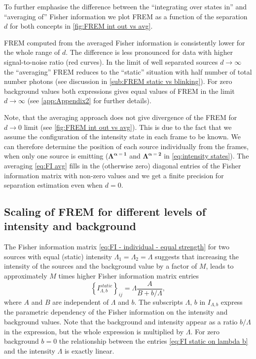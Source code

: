 To further emphasise the difference between the ``integrating over states in'' and ``averaging of'' Fisher information we plot FREM as a function of the separation $d$ for both concepts in \autoref{fig:FREM int out vs avg}.

FREM computed from the averaged Fisher information is consistently lower for the whole range of $d$. The difference is less pronounced for data with higher signal-to-noise ratio (red curves). In the limit of well separated sources $d\rightarrow\infty$ the ``averaging'' FREM reduces to the ``static'' situation with half number of total number photons (see discussion in \autoref{sub:FREM static vs blinking}). For zero background values both expressions gives equal values of FREM in the limit $d\rightarrow\infty$ (see \autoref{app:Appendix2} for further details).

Note, that the averaging approach does not give divergence of the FREM for $d\rightarrow 0$ limit (see \autoref{fig:FREM int out vs avg}\aaa). This is due to the fact that we assume the configuration of the intensity state in each frame to be known. We can therefore determine the position of each source individually from the frames, when only one source is emitting ($\bm{\Lambda^{\alpha=1}}$ and $\bm{\Lambda^{\alpha=2}}$ in \autoref{eq:intensity states}). The averaging \autoref{eq:FI avg} fills in the (otherwise zero) diagonal entries of the Fisher information matrix with non-zero values and we get a finite precision for separation estimation even when $d=0$.


\subsection{Scaling of FREM for different levels of intensity and background\label{sub:scaling}}

The Fisher information matrix \autoref{eq:FI - individual - equal strength} for two sources with equal (static) intensity $\Lambda_1=\Lambda_2=\Lambda$ suggests that increasing the intensity of the sources and the background value by a factor of $M$, leads to approximately $M$ times higher Fisher information matrix entries
%
\begin{equation}
	\left\{I_{\Lambda,b}^{static}\right\}_{ij}=\Lambda\frac{A}{B+b/\Lambda},
	\label{eq:FI static on lambda b}
\end{equation}
%
where $A$ and $B$ are independent of $\Lambda$ and $b$. The subscripts $\Lambda,\,b$ in $I_{\Lambda,b}$ express the parametric dependency of the Fisher information on the intensity and background values.  Note that the background and intensity appear as a ratio $b/\Lambda$ in the expression, but the whole expression is multiplied by $\Lambda$. For zero background $b=0$ the relationship between the entries \autoref{eq:FI static on lambda b} and the intensity $\Lambda$ is exactly linear. 

